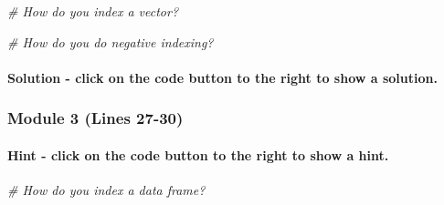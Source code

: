 \documentclass[
]{article}
\newenvironment{Shaded}{\begin{snugshade}}{\end{snugshade}}
\newcommand{\CommentTok}[1]{\textcolor[rgb]{0.56,0.35,0.01}{\textit{#1}}}
\newcommand{\DecValTok}[1]{\textcolor[rgb]{0.00,0.00,0.81}{#1}}
\newcommand{\KeywordTok}[1]{\textcolor[rgb]{0.13,0.29,0.53}{\textbf{#1}}}
\newcommand{\NormalTok}[1]{#1}
\newcommand{\OperatorTok}[1]{\textcolor[rgb]{0.81,0.36,0.00}{\textbf{#1}}}
\begin{document}
\begin{Shaded}
\begin{Highlighting}[]
\CommentTok{# How do you index a vector?}
\end{Highlighting}
\end{Shaded}

\begin{Shaded}
\begin{Highlighting}[]
\CommentTok{# How do you do negative indexing?}
\end{Highlighting}
\end{Shaded}

\hypertarget{solution---click-on-the-code-button-to-the-right-to-show-a-solution.}{%
\paragraph{Solution - click on the code button to the right to show a
solution.}\label{solution---click-on-the-code-button-to-the-right-to-show-a-solution.}}

\begin{Shaded}
\end{Shaded}

\hypertarget{module-3-lines-27-30}{%
\subsubsection{Module 3 (Lines 27-30)}\label{module-3-lines-27-30}}

\hypertarget{hint---click-on-the-code-button-to-the-right-to-show-a-hint.}{%
\paragraph{Hint - click on the code button to the right to show a
hint.}\label{hint---click-on-the-code-button-to-the-right-to-show-a-hint.}}

\begin{Shaded}
\begin{Highlighting}[]
\CommentTok{# How do you index a data frame?}
\end{Highlighting}
\end{Shaded}
\end{document}
